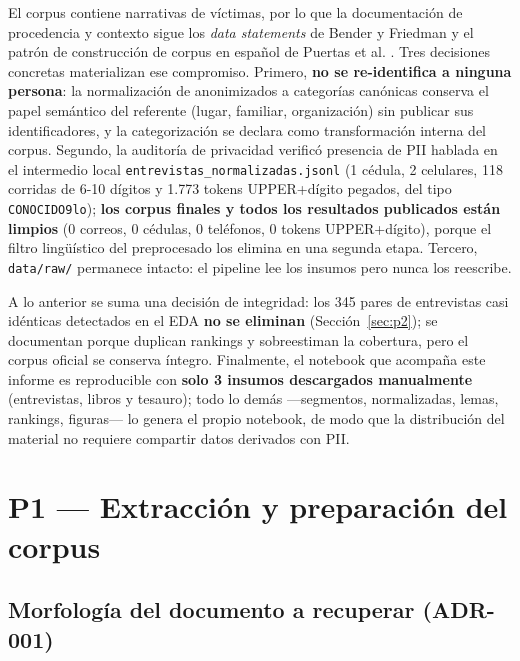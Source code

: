 \documentclass[11pt]{tg_usta}
\begin{document}
El corpus contiene narrativas de víctimas, por lo que la documentación de procedencia y contexto sigue los \textit{data statements} de Bender y Friedman \cite{bender2018data} y el patrón de construcción de corpus en español de Puertas et al. \cite{puertas2018automatic}. Tres decisiones concretas materializan ese compromiso. Primero, \textbf{no se re-identifica a ninguna persona}: la normalización de anonimizados a categorías canónicas conserva el papel semántico del referente (lugar, familiar, organización) sin publicar sus identificadores, y la categorización se declara como transformación interna del corpus. Segundo, la auditoría de privacidad verificó presencia de PII hablada en el intermedio local \texttt{entrevistas\_normalizadas.jsonl} (1 cédula, 2 celulares, 118 corridas de 6-10 dígitos y 1.773 tokens UPPER+dígito pegados, del tipo \texttt{CONOCIDO9lo}); \textbf{los corpus finales y todos los resultados publicados están limpios} (0 correos, 0 cédulas, 0 teléfonos, 0 tokens UPPER+dígito), porque el filtro lingüístico del preprocesado los elimina en una segunda etapa. Tercero, \texttt{data/raw/} permanece intacto: el pipeline lee los insumos pero nunca los reescribe.

A lo anterior se suma una decisión de integridad: los 345 pares de entrevistas casi idénticas detectados en el EDA \textbf{no se eliminan} (Sección~\ref{sec:p2}); se documentan porque duplican rankings y sobreestiman la cobertura, pero el corpus oficial se conserva íntegro. Finalmente, el notebook que acompaña este informe es reproducible con \textbf{solo 3 insumos descargados manualmente} (entrevistas, libros y tesauro); todo lo demás ---segmentos, normalizadas, lemas, rankings, figuras--- lo genera el propio notebook, de modo que la distribución del material no requiere compartir datos derivados con PII.


\section{P1 --- Extracción y preparación del corpus}\label{sec:p1}

\subsection{Morfología del documento a recuperar (ADR-001)}
\end{document}
